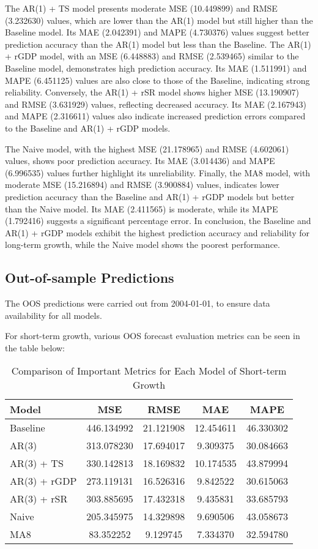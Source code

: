\documentclass[12pt]{article}
\begin{document}
The AR(1) + TS model presents moderate MSE (10.449899) and RMSE (3.232630) values, which are lower than the AR(1) model but still higher than the Baseline model. Its MAE (2.042391) and MAPE (4.730376) values suggest better prediction accuracy than the AR(1) model but less than the Baseline. The AR(1) + rGDP model, with an MSE (6.448883) and RMSE (2.539465) similar to the Baseline model, demonstrates high prediction accuracy. Its MAE (1.511991) and MAPE (6.451125) values are also close to those of the Baseline, indicating strong reliability. Conversely, the AR(1) + rSR model shows higher MSE (13.190907) and RMSE (3.631929) values, reflecting decreased accuracy. Its MAE (2.167943) and MAPE (2.316611) values also indicate increased prediction errors compared to the Baseline and AR(1) + rGDP models.

The Naive model, with the highest MSE (21.178965) and RMSE (4.602061) values, shows poor prediction accuracy. Its MAE (3.014436) and MAPE (6.996535) values further highlight its unreliability. Finally, the MA8 model, with moderate MSE (15.216894) and RMSE (3.900884) values, indicates lower prediction accuracy than the Baseline and AR(1) + rGDP models but better than the Naive model. Its MAE (2.411565) is moderate, while its MAPE (1.792416) suggests a significant percentage error. In conclusion, the Baseline and AR(1) + rGDP models exhibit the highest prediction accuracy and reliability for long-term growth, while the Naive model shows the poorest performance.

\subsection{Out-of-sample Predictions}

The OOS predictions were carried out from 2004-01-01, to ensure data availability for all models. 

For short-term growth, various OOS forecast evaluation metrics can be seen in the table below:

\begin{table}[H]
\centering
\begin{tabular}{lcccc}
\hline
Model & MSE & RMSE & MAE & MAPE \\
\hline
Baseline & 446.134992 & 21.121908 & 12.454611 & 46.330302 \\
AR(3) & 313.078230 & 17.694017 & 9.309375 & 30.084663 \\
AR(3) + TS & 330.142813 & 18.169832 & 10.174535 & 43.879994 \\
AR(3) + rGDP & 273.119131 & 16.526316 & 9.842522 & 30.615063 \\
AR(3) + rSR & 303.885695 & 17.432318 & 9.435831 & 33.685793 \\
Naive & 205.345975 & 14.329898 & 9.690506 & 43.058673 \\
MA8 & 83.352252 & 9.129745 & 7.334370 & 32.594780 \\
\hline
\end{tabular}
\caption{Comparison of Important Metrics for Each Model of Short-term Growth}
\label{tab:model_comparison_lt}
\end{table}
\end{document}
